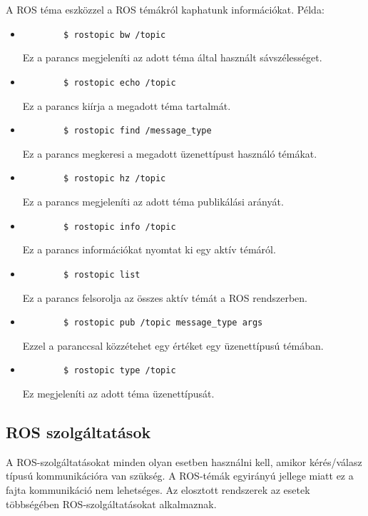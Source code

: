 \documentclass{article}
\begin{document}
A ROS téma eszközzel a ROS témákról kaphatunk információkat. Példa:
\begin{itemize}
    \item
    \begin{verbatim}
        $ rostopic bw /topic
    \end{verbatim}Ez a parancs megjeleníti az adott téma által használt sávszélességet.
    \item
    \begin{verbatim}
        $ rostopic echo /topic
    \end{verbatim}Ez a parancs kiírja a megadott téma tartalmát.
    \item
    \begin{verbatim}
        $ rostopic find /message_type
    \end{verbatim}Ez a parancs megkeresi a megadott üzenettípust használó témákat.
    \item
    \begin{verbatim}
        $ rostopic hz /topic
    \end{verbatim}Ez a parancs megjeleníti az adott téma publikálási arányát.
    \item
    \begin{verbatim}
        $ rostopic info /topic
    \end{verbatim}Ez a parancs információkat nyomtat ki egy aktív témáról.
    \item
    \begin{verbatim}
        $ rostopic list
    \end{verbatim}Ez a parancs felsorolja az összes aktív témát a ROS rendszerben.
    \item
    \begin{verbatim}
        $ rostopic pub /topic message_type args
    \end{verbatim}Ezzel a paranccsal közzétehet egy értéket egy üzenettípusú témában.
    \item
    \begin{verbatim}
        $ rostopic type /topic
    \end{verbatim}Ez megjeleníti az adott téma üzenettípusát.
\end{itemize}


\subsection{ROS szolgáltatások}
A ROS-szolgáltatásokat minden olyan esetben használni kell, amikor kérés/válasz típusú kommunikációra van szükség. A ROS-témák egyirányú jellege miatt ez a fajta kommunikáció nem lehetséges. Az elosztott rendszerek az esetek többségében ROS-szolgáltatásokat alkalmaznak.
\end{document}
